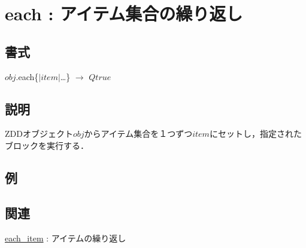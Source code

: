 
\section{each : アイテム集合の繰り返し\label{sect:each}}
\subsection*{書式}
$obj$.each\{$|item|$\ldots\} $\rightarrow$ $Qtrue$

\subsection*{説明}
ZDDオブジェクト$obj$からアイテム集合を１つずつ$item$にセットし，指定されたブロックを実行する．

\subsection*{例}


\subsection*{関連}
\hyperref[sect:each_item]{each\_item} : アイテムの繰り返し
